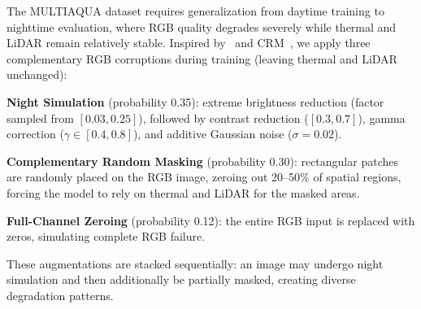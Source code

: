 The MULTIAQUA dataset requires generalization from daytime training to nighttime evaluation, where RGB quality degrades severely while thermal and LiDAR remain relatively stable.
Inspired by~\cite{muhovic2025multiaqua} and CRM~\cite{shin2024crm}, we apply three complementary RGB corruptions during training (leaving thermal and LiDAR unchanged):

\noindent\textbf{Night Simulation} (probability 0.35): extreme brightness reduction (factor sampled from $[0.03, 0.25]$), followed by contrast reduction ($[0.3, 0.7]$), gamma correction ($\gamma \in [0.4, 0.8]$), and additive Gaussian noise ($\sigma = 0.02$).

\noindent\textbf{Complementary Random Masking} (probability 0.30): rectangular patches are randomly placed on the RGB image, zeroing out 20--50\% of spatial regions, forcing the model to rely on thermal and LiDAR for the masked areas.

\noindent\textbf{Full-Channel Zeroing} (probability 0.12): the entire RGB input is replaced with zeros, simulating complete RGB failure.

These augmentations are stacked sequentially: an image may undergo night simulation and then additionally be partially masked, creating diverse degradation patterns.
